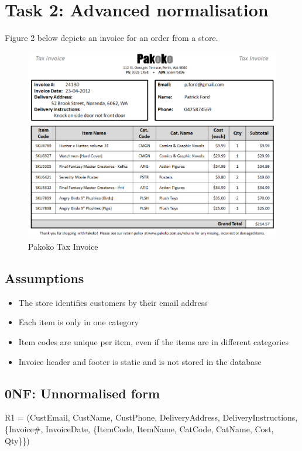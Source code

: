 \newpage
\section{Task 2: Advanced normalisation}

Figure 2 below depicts an invoice for an order from a store.

\begin{figure}[H]
\centering
\caption{Pakoko Tax Invoice}
\includegraphics[scale=1]{./img/task2.pdf}
\end{figure}

\subsection*{Assumptions}

\begin{itemize}
\item The store identifies customers by their email address
\item Each item is only in one category
\item Item codes are unique per item, even if the items are in different categories
\item Invoice header and footer is static and is not stored in the database
\end{itemize}

\subsection{0NF: Unnormalised form}

R1 = (CustEmail, CustName, CustPhone, DeliveryAddress, DeliveryInstructions, \{Invoice\#, InvoiceDate, \{ItemCode, ItemName, CatCode, CatName, Cost, Qty\}\})

